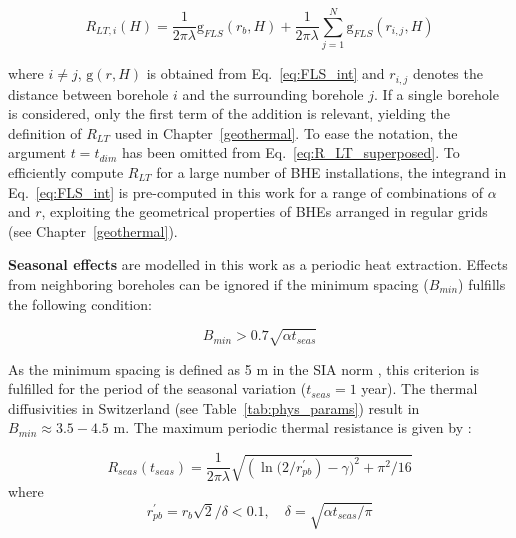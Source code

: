 \begin{equation}
\label{eq:R_LT_superposed}
    R_{LT, i}(H) = \frac{1}{2 \pi \lambda} \mathrm{g}_{FLS}(r_b, H) + \frac{1}{2 \pi \lambda} \sum_{j=1}^N \mathrm{g}_{FLS}(r_{i,j}, H) 
\end{equation}

where $i \neq j$, $\mathrm{g}(r, H)$ is obtained from Eq.~\ref{eq:FLS_int} and $r_{i,j}$ denotes the distance between borehole $i$ and the surrounding borehole $j$. If a single borehole is considered, only the first term of the addition is relevant, yielding the definition of $R_{LT}$ used in Chapter~\ref{geothermal}. To ease the notation, the argument $t = t_\mathit{dim}$ has been omitted from Eq.~\ref{eq:R_LT_superposed}.
To efficiently compute $R_{LT}$ for a large number of BHE installations, the integrand in Eq.~\ref{eq:FLS_int} is pre-computed in this work for a range of combinations of $\alpha$ and $r$, exploiting the geometrical properties of BHEs arranged in regular grids (see Chapter~\ref{geothermal}).

\textbf{Seasonal effects} are modelled in this work as a periodic heat extraction. Effects from neighboring boreholes can be ignored if the minimum spacing ($B_{min}$) fulfills the following condition:

\begin{equation}
    B_{min} > 0.7 \sqrt{\alpha t_{seas}}
\end{equation}

As the minimum spacing is defined as 5 m in the SIA norm \cite{sia_sondes_2010}, this criterion is fulfilled for the period of the seasonal variation ($t_{seas} = 1$ year). The thermal diffusivities in Switzerland (see Table~\ref{tab:phys_params}) result in $B_{min} \approx 3.5-4.5$ m. The maximum periodic thermal resistance is given by \citep{claesson_conductive_1988, pahud_geothermal_2002}:

\begin{equation}
    R_{seas}(t_\mathit{seas}) = \frac{1}{2 \pi \lambda} \sqrt{\left(\ln(2/r_{pb}^\prime \right) - \gamma)^2 + \pi^2/16}
\end{equation}
where
\begin{equation*}
    r_{pb}^\prime = r_b \sqrt{2}/\delta < 0.1, \quad \delta = \sqrt{ \alpha t_\mathit{seas} / \pi}
\end{equation*}

